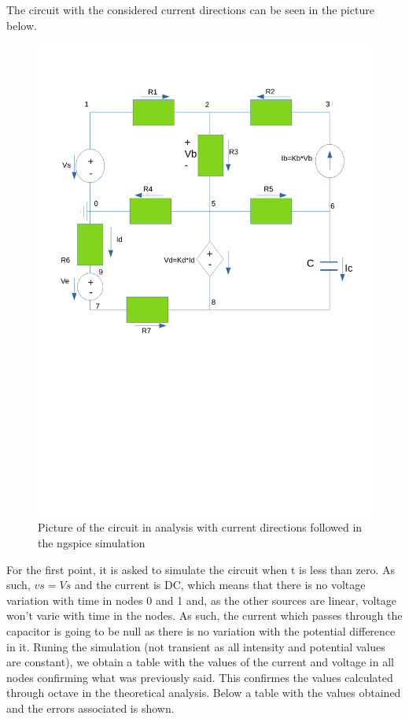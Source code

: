\par The circuit with the considered current directions can be seen in the picture below.
\newpage
\begin{figure}[h!] \centering
\includegraphics[width=0.6\linewidth]{Desenho_2.pdf}
\caption{Picture of the circuit in analysis with current directions followed in the ngspice simulation}
\label{fig:Ngspice circuit}
\end{figure}

\par For the first point, it is asked to simulate the circuit when t is less than zero. As such, $vs=Vs$ and the current is DC, which means that there is no voltage variation with time in nodes 0 and 1 and, as the other sources are linear, voltage won't varie with time in the nodes. As such, the current which passes through the capacitor is going to be null as there is no variation with the potential difference in it. Runing the simulation (not transient as all intensity and potential values are constant), we obtain a table with the values of the current and voltage in all nodes confirming what was previously said. This confirmes the values calculated through octave in the theoretical analysis. Below a table with the values obtained and the errors associated is shown.

\newpage

\vspace{5mm}
\begin{table}[h!]
\centering
\begin{tabularx}{0.6\textwidth} {
  | >{\raggedright\arraybackslash}X
  | >{\raggedleft\arraybackslash}X | }
 \hline

\end{tabularx}
\end{table}
\vspace{5mm}

